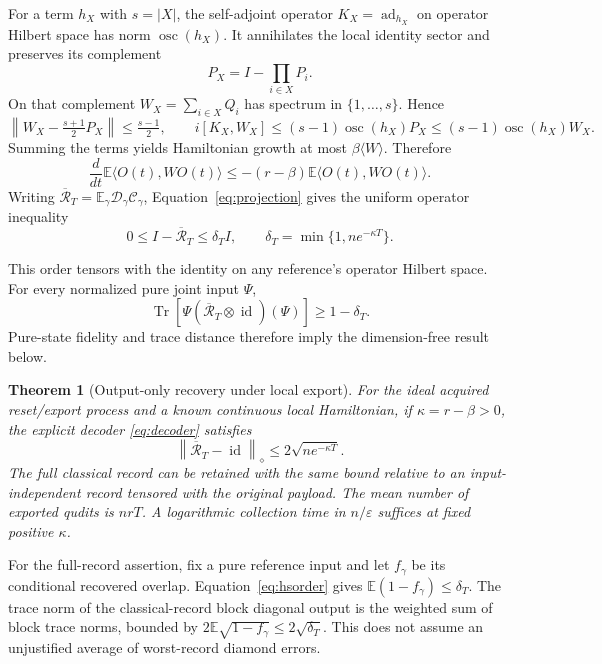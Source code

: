 \documentclass[11pt,a4paper]{article}
\newtheorem{theorem}{Theorem}\newtheorem{lemma}[theorem]{Lemma}\newtheorem{corollary}[theorem]{Corollary}
\newcommand{\id}{\operatorname{id}}\newcommand{\Tr}{\operatorname{Tr}}\newcommand{\osc}{\operatorname{osc}}
\newcommand{\norm}[1]{\left\lVert #1\right\rVert}\newcommand{\ket}[1]{\lvert #1\rangle}\newcommand{\bra}[1]{\langle #1\rvert}
\newcommand{\cC}{\mathcal C}\newcommand{\cD}{\mathcal D}\newcommand{\cR}{\mathcal R}\newcommand{\cV}{\mathcal V}\newcommand{\cJ}{\mathcal J}
\begin{document}
For a term $h_X$ with $s=|X|$, the self-adjoint operator $K_X=\operatorname{ad}_{h_X}$ on operator Hilbert space has norm $\osc(h_X)$. It annihilates the local identity sector and preserves its complement
\begin{equation}
P_X=I-\prod_{i\in X}P_i.
\end{equation}
On that complement $W_X=\sum_{i\in X}Q_i$ has spectrum in $\{1,\ldots,s\}$. Hence
\begin{equation}
\norm{W_X-\tfrac{s+1}{2}P_X}\le\tfrac{s-1}{2},\qquad
i[K_X,W_X]\le(s-1)\osc(h_X)P_X\le(s-1)\osc(h_X)W_X.
\end{equation}
Summing the terms yields Hamiltonian growth at most $\beta\langle W\rangle$. Therefore
\begin{equation}
\frac{d}{dt}\mathbb E\langle O(t),WO(t)\rangle
\le-(r-\beta)\mathbb E\langle O(t),WO(t)\rangle.
\end{equation}
Writing $\overline{\cR}_T=\mathbb E_\gamma\cD_\gamma\cC_\gamma$, Equation~\eqref{eq:projection} gives the uniform operator inequality
\begin{equation}
0\le I-\overline{\cR}_T\le\delta_T I,\qquad
\delta_T=\min\{1,n e^{-\kappa T}\}.
\label{eq:hsorder}
\end{equation}

This order tensors with the identity on any reference's operator Hilbert space. For every normalized pure joint input $\Psi$,
\begin{equation}
\Tr\!\left[\Psi(\overline{\cR}_T\otimes\id)(\Psi)\right]\ge1-\delta_T.
\end{equation}
Pure-state fidelity and trace distance therefore imply the dimension-free result below.

\begin{theorem}[Output-only recovery under local export]
For the ideal acquired reset/export process and a known continuous local Hamiltonian, if $\kappa=r-\beta>0$, the explicit decoder \eqref{eq:decoder} satisfies
\begin{equation}
\boxed{\norm{\overline{\cR}_T-\id}_\diamond\le2\sqrt{n e^{-\kappa T}}.}
\label{eq:main}
\end{equation}
The full classical record can be retained with the same bound relative to an input-independent record tensored with the original payload. The mean number of exported qudits is $nrT$. A logarithmic collection time in $n/\varepsilon$ suffices at fixed positive $\kappa$.
\end{theorem}

For the full-record assertion, fix a pure reference input and let $f_\gamma$ be its conditional recovered overlap. Equation~\eqref{eq:hsorder} gives $\mathbb E(1-f_\gamma)\le\delta_T$. The trace norm of the classical-record block diagonal output is the weighted sum of block trace norms, bounded by $2\mathbb E\sqrt{1-f_\gamma}\le2\sqrt{\delta_T}$. This does not assume an unjustified average of worst-record diamond errors.
\end{document}
